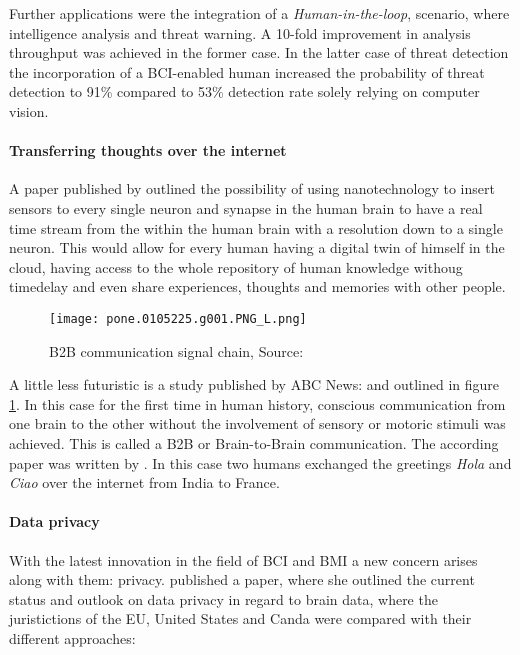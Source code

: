                 Further applications were the integration of a \textit{Human-in-the-loop}, scenario, where intelligence analysis and threat warning. A 10-fold improvement in analysis throughput was achieved in the former case. In the latter case of threat detection the incorporation of a BCI-enabled human increased the probability of threat detection to 91\% compared to 53\% detection rate solely relying on computer vision.

            \paragraph{Transferring thoughts over the internet}

                A paper published by \cite[]{Martins.2019} outlined the possibility of using nanotechnology to insert sensors to every single neuron and synapse in the human brain to have a real time stream from the within the human brain with a resolution down to a single neuron. This would allow for every human having a digital twin of himself in the cloud, having access to the whole repository of human knowledge withoug timedelay and even share experiences, thoughts and memories with other people.

                \begin{figure}[h]     %
                    \centering
                    \texttt{[image: pone.0105225.g001.PNG\_L.png]} 
                    \caption{B2B communication signal chain, Source: \cite{Grau.2014}}\label{b2b-chain}
                \end{figure}    

                A little less futuristic is a study published by ABC News: \cite[]{Lee.2016} and outlined in figure \ref*{b2b-chain}. In this case for the first time in human history, conscious communication from one brain to the other without the involvement of sensory or motoric stimuli was achieved. This is called a B2B or Brain-to-Brain communication. The according paper was written by \cite[]{Grau.2014}. In this case two humans exchanged the greetings \textit{Hola} and \textit{Ciao} over the internet from India to France.

            \paragraph{Data privacy}

                With the latest innovation in the field of BCI and BMI a new concern arises along with them: privacy. \cite[]{Greenberg.2019} published a paper, where she outlined the current status and outlook on data privacy in regard to brain data, where the juristictions of the EU, United States and Canda were compared with their different approaches:

